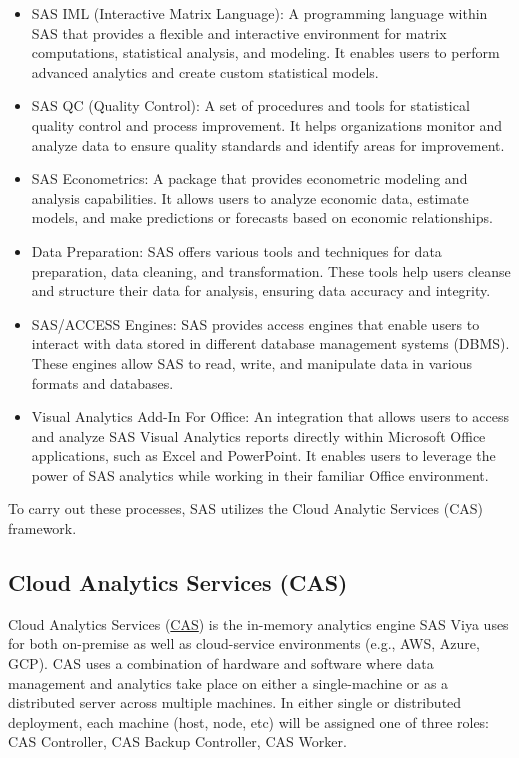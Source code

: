 \begin{itemize}
    \item SAS IML (Interactive Matrix Language): A programming language within SAS that provides a flexible and interactive environment for matrix computations, statistical analysis, and modeling. It enables users to perform advanced analytics and create custom statistical models.
    \item SAS QC (Quality Control): A set of procedures and tools for statistical quality control and process improvement. It helps organizations monitor and analyze data to ensure quality standards and identify areas for improvement.
    \item SAS Econometrics: A package that provides econometric modeling and analysis capabilities. It allows users to analyze economic data, estimate models, and make predictions or forecasts based on economic relationships.
    \item Data Preparation: SAS offers various tools and techniques for data preparation, data cleaning, and transformation. These tools help users cleanse and structure their data for analysis, ensuring data accuracy and integrity.
    \item SAS/ACCESS Engines: SAS provides access engines that enable users to interact with data stored in different database management systems (DBMS). These engines allow SAS to read, write, and manipulate data in various formats and databases.
    \item Visual Analytics Add-In For Office: An integration that allows users to access and analyze SAS Visual Analytics reports directly within Microsoft Office applications, such as Excel and PowerPoint. It enables users to leverage the power of SAS analytics while working in their familiar Office environment.
\end{itemize}

To carry out these processes, SAS utilizes the Cloud Analytic Services (CAS) framework.

\subsection{Cloud Analytics Services (CAS)}
Cloud Analytics Services (\href{https://documentation.sas.com/doc/en/calcdc/3.3/calserverscas/n05000viyaservers000000admin.htm}{CAS}) is the in-memory analytics engine SAS Viya uses for both on-premise as well as cloud-service environments (e.g., AWS, Azure, GCP). CAS uses a combination of hardware and software where data management and analytics take place on either a single-machine or as a distributed server across multiple machines. In either single or distributed deployment, each machine (host, node, etc) will be assigned one of three roles: CAS Controller, CAS Backup Controller, CAS Worker.

